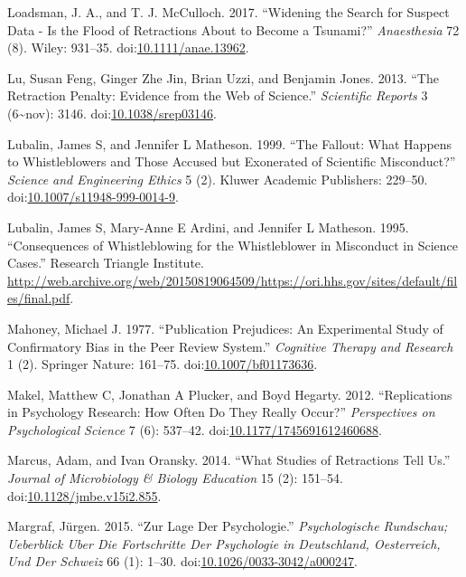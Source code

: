 \documentclass[a5paper]{book}
\begin{document}
\hypertarget{ref-doi:10.1111ux2fanae.13962}{}
Loadsman, J. A., and T. J. McCulloch. 2017. ``Widening the Search for
Suspect Data - Is the Flood of Retractions About to Become a Tsunami?''
\emph{Anaesthesia} 72 (8). Wiley: 931--35.
doi:\href{https://doi.org/10.1111/anae.13962}{10.1111/anae.13962}.

\hypertarget{ref-doi:10.1038ux2fsrep03146}{}
Lu, Susan Feng, Ginger Zhe Jin, Brian Uzzi, and Benjamin Jones. 2013.
``The Retraction Penalty: Evidence from the Web of Science.''
\emph{Scientific Reports} 3 (6\textasciitilde{}nov): 3146.
doi:\href{https://doi.org/10.1038/srep03146}{10.1038/srep03146}.

\hypertarget{ref-doi:10.1007ux2fs11948-999-0014-9}{}
Lubalin, James S, and Jennifer L Matheson. 1999. ``The Fallout: What
Happens to Whistleblowers and Those Accused but Exonerated of Scientific
Misconduct?'' \emph{Science and Engineering Ethics} 5 (2). Kluwer
Academic Publishers: 229--50.
doi:\href{https://doi.org/10.1007/s11948-999-0014-9}{10.1007/s11948-999-0014-9}.

\hypertarget{ref-lubalin1995}{}
Lubalin, James S, Mary-Anne E Ardini, and Jennifer L Matheson. 1995.
``Consequences of Whistleblowing for the Whistleblower in Misconduct in
Science Cases.'' Research Triangle Institute.
\url{http://web.archive.org/web/20150819064509/https://ori.hhs.gov/sites/default/files/final.pdf}.

\hypertarget{ref-doi:10.1007ux2fbf01173636}{}
Mahoney, Michael J. 1977. ``Publication Prejudices: An Experimental
Study of Confirmatory Bias in the Peer Review System.'' \emph{Cognitive
Therapy and Research} 1 (2). Springer Nature: 161--75.
doi:\href{https://doi.org/10.1007/bf01173636}{10.1007/bf01173636}.

\hypertarget{ref-doi:10.1177ux2f1745691612460688}{}
Makel, Matthew C, Jonathan A Plucker, and Boyd Hegarty. 2012.
``Replications in Psychology Research: How Often Do They Really Occur?''
\emph{Perspectives on Psychological Science} 7 (6): 537--42.
doi:\href{https://doi.org/10.1177/1745691612460688}{10.1177/1745691612460688}.

\hypertarget{ref-doi:10.1128ux2fjmbe.v15i2.855}{}
Marcus, Adam, and Ivan Oransky. 2014. ``What Studies of Retractions Tell
Us.'' \emph{Journal of Microbiology \& Biology Education} 15 (2):
151--54.
doi:\href{https://doi.org/10.1128/jmbe.v15i2.855}{10.1128/jmbe.v15i2.855}.

\hypertarget{ref-doi:10.1026ux2f0033-3042ux2fa000247}{}
Margraf, Jürgen. 2015. ``Zur Lage Der Psychologie.''
\emph{Psychologische Rundschau; Ueberblick Uber Die Fortschritte Der
Psychologie in Deutschland, Oesterreich, Und Der Schweiz} 66 (1): 1--30.
doi:\href{https://doi.org/10.1026/0033-3042/a000247}{10.1026/0033-3042/a000247}.
\end{document}

